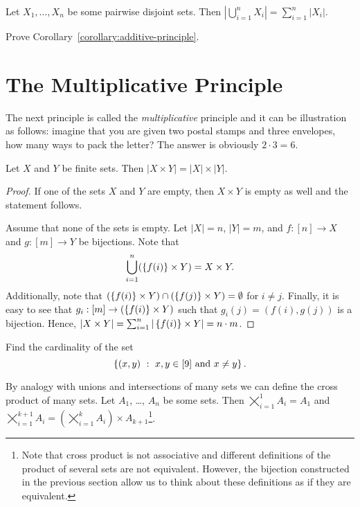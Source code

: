 \begin{corollary}
\label{corollary:additive-principle}
  Let $X_1, \dots, X_n$ be some pairwise disjoint sets. Then
  $\left|\bigcup_{i = 1}^n X_i\right| = \sum_{i = 1}^n |X_i|$.
\end{corollary}

\begin{exercise}
  Prove Corollary~\ref{corollary:additive-principle}.
\end{exercise}


\section{The Multiplicative Principle}
The next principle is called the \textit{multiplicative} principle and it can be
illustration as follows: imagine that you are given two postal stamps and
three envelopes, how many ways to pack the letter? The answer is obviously
$2 \cdot 3 = 6$.
\begin{theorem}
  Let $X$ and $Y$ be finite sets. Then $|X \times Y| = |X| \times |Y|$.
\end{theorem}
\begin{proof}
  If one of the sets $X$ and $Y$ are empty, then $X \times Y$ is empty as well
  and the statement follows.

  Assume that none of the sets is empty. Let $|X| = n$, $|Y| = m$, and
  $f : [n] \to X$ and $g : [m] \to Y$ be bijections.
  Note that
  \[
    \bigcup_{i = 1}^n (\set{f(i)} \times Y) = X \times Y.
  \]
  Additionally, note that $(\set{f(i)} \times Y) \cap (\set{f(j)} \times Y) =
  \emptyset$ for $i \neq j$. Finally, it is easy to see that $g_i : [m] \to
  (\set{f(i)} \times Y)$ such that $g_i(j) = (f(i), g(j))$ is a bijection.
  Hence,
  $|X \times Y| = \sum_{i = 1}^n |\set{f(i)} \times Y| = n \cdot m$.
\end{proof}

\begin{exercise}
  Find the cardinality of the set
  \[
    \set[{x, y \in [9] \text{ and } x \neq y}]{(x, y)}.
  \]
\end{exercise}

By analogy with unions and intersections of many sets we can define the cross
product of many sets.
Let $A_1$, \dots, $A_n$ be some sets. Then $\bigtimes_{i = 1}^1 A_i = A_1$ and
$\bigtimes_{i = 1}^{k + 1} A_i =
  \left(\bigtimes_{i = 1}^k A_i\right) \times A_{k + 1}$\footnote{%
    Note that cross product is not associative and different definitions of the
    product of several sets are not equivalent. However, the bijection
    constructed in the previous section allow us to think about these
    definitions as if they are equivalent.
}.

